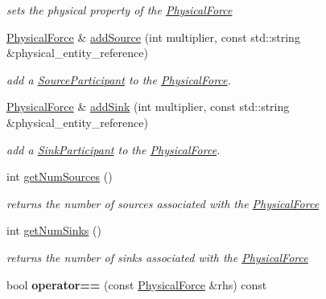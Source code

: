 \begin{DoxyCompactItemize}
\begin{DoxyCompactList}\small\item\em sets the physical property of the \hyperlink{classomexmeta_1_1PhysicalForce}{Physical\+Force} \end{DoxyCompactList}\item 
\hyperlink{classomexmeta_1_1PhysicalForce}{Physical\+Force} \& \hyperlink{classomexmeta_1_1PhysicalForce_ace7d3703d7e4bdb9a256208f456f2c4f}{add\+Source} (int multiplier, const std\+::string \&physical\+\_\+entity\+\_\+reference)
\begin{DoxyCompactList}\small\item\em add a \hyperlink{classomexmeta_1_1SourceParticipant}{Source\+Participant} to the \hyperlink{classomexmeta_1_1PhysicalForce}{Physical\+Force}. \end{DoxyCompactList}\item 
\hyperlink{classomexmeta_1_1PhysicalForce}{Physical\+Force} \& \hyperlink{classomexmeta_1_1PhysicalForce_a8ec5e262b82526ac914d8c7f10b6c2f1}{add\+Sink} (int multiplier, const std\+::string \&physical\+\_\+entity\+\_\+reference)
\begin{DoxyCompactList}\small\item\em add a \hyperlink{classomexmeta_1_1SinkParticipant}{Sink\+Participant} to the \hyperlink{classomexmeta_1_1PhysicalForce}{Physical\+Force}. \end{DoxyCompactList}\item 
int \hyperlink{classomexmeta_1_1PhysicalForce_a9910c8edac57daf70faa1f1e2e0208d1}{get\+Num\+Sources} ()
\begin{DoxyCompactList}\small\item\em returns the number of sources associated with the \hyperlink{classomexmeta_1_1PhysicalForce}{Physical\+Force} \end{DoxyCompactList}\item 
int \hyperlink{classomexmeta_1_1PhysicalForce_a1135c75705b59afa7037bab313009534}{get\+Num\+Sinks} ()
\begin{DoxyCompactList}\small\item\em returns the number of sinks associated with the \hyperlink{classomexmeta_1_1PhysicalForce}{Physical\+Force} \end{DoxyCompactList}\item 
\mbox{\label{classomexmeta_1_1PhysicalForce_affa0a1f3cdce0a3336d56658a92c65f3}} 
bool {\bfseries operator==} (const \hyperlink{classomexmeta_1_1PhysicalForce}{Physical\+Force} \&rhs) const

\end{DoxyCompactItemize}
